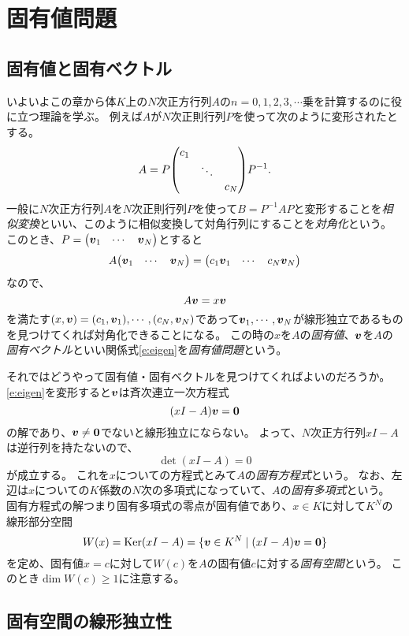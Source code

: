 
\chapter{固有値問題}

\section{固有値と固有ベクトル}

いよいよこの章から体$K$上の$N$次正方行列$A$の$n = 0, 1, 2, 3, \cdots$乗を計算するのに役に立つ理論を学ぶ。
例えば$A$が$N$次正則行列$P$を使って次のように変形されたとする。
$$
A = P\mqty(\dmat{c_1, \ddots, c_N})P^{-1}.
$$
一般に$N$次正方行列$A$を$N$次正則行列$P$を使って$B = P^{-1} A P$と変形することを\emph{相似変換}といい、このように相似変換して対角行列にすることを\emph{対角化}という。
このとき、$P = \mqty(\vb*{v}_1 & \cdots & \vb*{v}_N)$とすると
$$
A\mqty(\vb*{v}_1 & \cdots & \vb*{v}_N) = \mqty(c_1\vb*{v}_1 & \cdots & c_N\vb*{v}_N)
$$
なので、
\begin{equation}
\label{e:eigen}
A\vb*{v} = x\vb*{v}
\end{equation}
を満たす$(x, \vb*{v}) = (c_1, \vb*{v}_1), \cdots, (c_N, \vb*{v}_N)$であって$\vb*{v}_1, \cdots, \vb*{v}_N$が線形独立であるものを見つけてくれば対角化できることになる。
この時の$x$を$A$の\emph{固有値}、$\vb*{v}$を$A$の\emph{固有ベクトル}といい関係式\eqref{e:eigen}を\emph{固有値問題}という。

それではどうやって固有値・固有ベクトルを見つけてくればよいのだろうか。
\eqref{e:eigen}を変形すると$\vb*{v}$は斉次連立一次方程式
$$
(x I-A)\vb*{v} = \vb*{0}
$$
の解であり、$\vb*{v} \ne \vb*{0}$でないと線形独立にならない。
よって、$N$次正方行列$x I-A$は逆行列を持たないので、
\begin{equation}
\label{e:eigeneq}
\det(x I-A) = 0
\end{equation}
が成立する。
これを$x$についての方程式とみて$A$の\emph{固有方程式}という。
なお、左辺は$x$についての$K$係数の$N$次の多項式になっていて、$A$の\emph{固有多項式}という。
固有方程式の解つまり固有多項式の零点が固有値であり、$x \in K$に対して$K^N$の線形部分空間
$$
W(x) = \operatorname{Ker}(x I-A) = \{ \vb*{v} \in K^N \mid (x I-A)\vb*{v} = \vb*{0} \}
$$
を定め、固有値$x = c$に対して$W(c)$を$A$の固有値$c$に対する\emph{固有空間}という。
このとき$\dim W(c) \ge 1$に注意する。

\section{固有空間の線形独立性}

